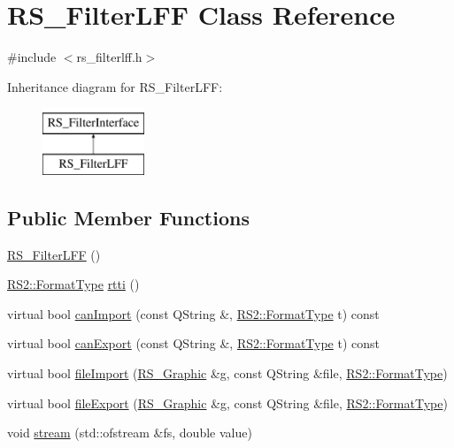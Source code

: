 \hypertarget{classRS__FilterLFF}{\section{R\-S\-\_\-\-Filter\-L\-F\-F Class Reference}
\label{classRS__FilterLFF}
}


{\ttfamily \#include $<$rs\-\_\-filterlff.\-h$>$}

Inheritance diagram for R\-S\-\_\-\-Filter\-L\-F\-F\-:\begin{figure}[H]
\begin{center}
\leavevmode
\includegraphics[height=2.000000cm]{classRS__FilterLFF}
\end{center}
\end{figure}
\subsection*{Public Member Functions}
\begin{DoxyCompactItemize}
\item 
\hyperlink{classRS__FilterLFF_a9bea6886779fb938e92ba4f6f978333e}{R\-S\-\_\-\-Filter\-L\-F\-F} ()
\item 
\hyperlink{classRS2_a077a6c94c9a0ab9962c4d4a612c7189b}{R\-S2\-::\-Format\-Type} \hyperlink{classRS__FilterLFF_a02d6970953f61c83973243942275376a}{rtti} ()
\item 
virtual bool \hyperlink{classRS__FilterLFF_a7300515fad668c046a48cb6462aea484}{can\-Import} (const Q\-String \&, \hyperlink{classRS2_a077a6c94c9a0ab9962c4d4a612c7189b}{R\-S2\-::\-Format\-Type} t) const 
\item 
virtual bool \hyperlink{classRS__FilterLFF_a415559dd3dde9e25d528f204efa8a764}{can\-Export} (const Q\-String \&, \hyperlink{classRS2_a077a6c94c9a0ab9962c4d4a612c7189b}{R\-S2\-::\-Format\-Type} t) const 
\item 
virtual bool \hyperlink{classRS__FilterLFF_a476f960396265b15dfb43b9c4742f76e}{file\-Import} (\hyperlink{classRS__Graphic}{R\-S\-\_\-\-Graphic} \&g, const Q\-String \&file, \hyperlink{classRS2_a077a6c94c9a0ab9962c4d4a612c7189b}{R\-S2\-::\-Format\-Type})
\item 
virtual bool \hyperlink{classRS__FilterLFF_abe710b43b21eacacc38c373f716bac36}{file\-Export} (\hyperlink{classRS__Graphic}{R\-S\-\_\-\-Graphic} \&g, const Q\-String \&file, \hyperlink{classRS2_a077a6c94c9a0ab9962c4d4a612c7189b}{R\-S2\-::\-Format\-Type})
\item 
void \hyperlink{classRS__FilterLFF_adb7cc53051e5f643cc3438198fa535bc}{stream} (std\-::ofstream \&fs, double value)
\end{DoxyCompactItemize}
